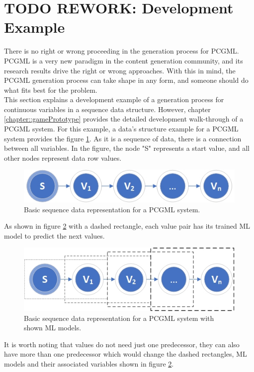 \documentclass[MGS,Master,english]{twbook}%
\begin{document}
\section{TODO REWORK: Development Example}
There is no right or wrong proceeding in the generation process for PCGML. PCGML is a very new paradigm in the content generation community, and its research results drive the right or wrong approaches. With this in mind, the PCGML generation process can take shape in any form, and someone should do what fits best for the problem.\\
This section explains a development example of a generation process for continuous variables in a sequence data structure. However, chapter \ref{chapter::gamePrototype} provides the detailed development walk-through of a PCGML system. For this example, a data’s structure example for a PCGML system provides the figure \ref{fig::PCGML::devExample::sequenceBase}. As it is a sequence of data, there is a connection between all variables. In the figure, the node "S" represents a start value, and all other nodes represent data row values. 
\begin{figure}[!htbp]
	\centering
	\includegraphics[width=0.5\linewidth]{PICs/PCGML_development_example_sequence_base}
	\caption{Basic sequence data representation for a PCGML system. }\label{fig::PCGML::devExample::sequenceBase}
\end{figure}
As shown in figure \ref{fig::PCGML::devExample::sequenceWithModels} with a dashed rectangle, each value pair has its trained ML model to predict the next values. 
\begin{figure}[!htbp]
	\centering
	\includegraphics[width=0.5\linewidth]{PICs/PCGML_development_example_sequence_with_models}
	\caption{Basic sequence data representation for a PCGML system with shown ML models.}\label{fig::PCGML::devExample::sequenceWithModels}
\end{figure}
It is worth noting that values do not need just one predecessor, they can also have more than one predecessor which would change the dashed rectangles, ML models and their associated variables shown in figure \ref{fig::PCGML::devExample::sequenceWithModels}.
\end{document}
